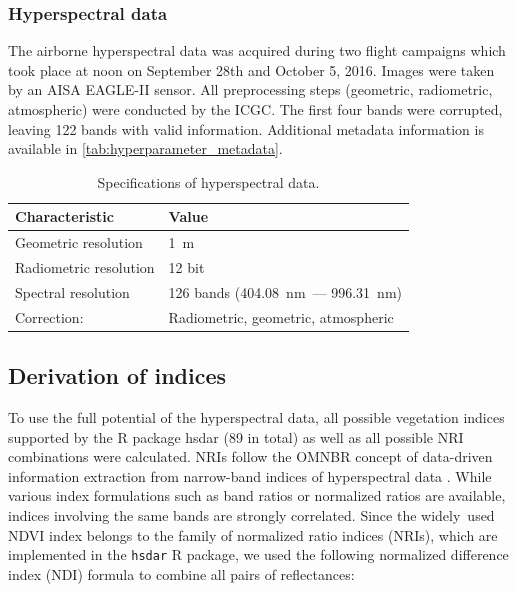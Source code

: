 \documentclass[remotesensing,article,submit,moreauthors,pdftex]{Definitions/mdpi}
\begin{document}

\subsubsection{Hyperspectral data}

The airborne hyperspectral data was acquired during two flight campaigns which took place at noon on September 28th and October 5, 2016.
Images were taken by an AISA EAGLE-II sensor.
All preprocessing steps (geometric, radiometric, atmospheric) were conducted by the \ac{ICGC}.
The first four bands were corrupted, leaving 122 bands with valid information.
Additional metadata information is available in \autoref{tab:hyperparameter_metadata}.


\begin{table}[t]
	\centering
	\caption[t]{Specifications of hyperspectral data.}
	\begingroup
	\begin{tabular}{ll}
		\\
		Characteristic         & Value                               \\
		\toprule
		Geometric resolution   & 1~m                                 \\
		Radiometric resolution & 12 bit                              \\
		Spectral resolution    & 126 bands (404.08~nm~--- 996.31~nm) \\
		Correction:            & Radiometric, geometric, atmospheric
	\end{tabular}
	\endgroup\label{tab:hyperparameter_metadata}
\end{table}

\subsection{Derivation of indices}

To use the full potential of the hyperspectral data, all possible vegetation indices supported by the R package hsdar (89 in total) as well as all possible \ac{NRI} combinations were calculated.
NRIs follow the \ac{OMNBR} concept of data-driven information extraction from narrow-band indices of hyperspectral data \cite{thenkabail2000,thenkabail2018}.
While various index formulations such as band ratios or normalized ratios are available, indices involving the same bands are strongly correlated.
Since the widely\ used NDVI index belongs to the family of normalized ratio indices (NRIs), which are implemented in the \texttt{hsdar} R package, we used the following normalized difference index (NDI) formula to combine all pairs of reflectances:
\end{document}
